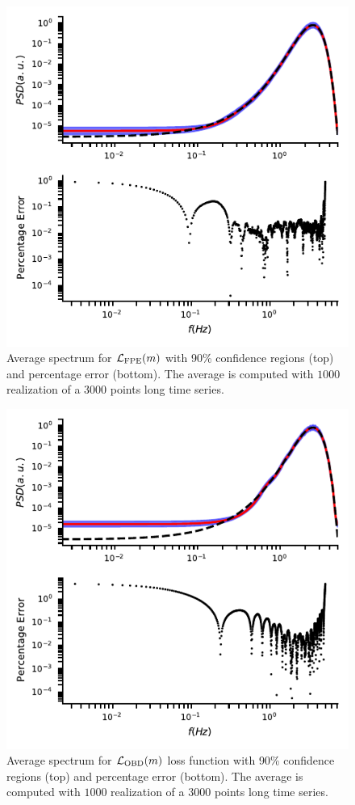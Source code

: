 \documentclass[twocolumn,showpacs,preprintnumbers,nofootinbib,prd,
superscriptaddress,10pt]{revtex4-1}
\begin{document}
\begin{figure}[t]
	\centering
	\includegraphics[width = \linewidth]{Images/optimisers_comparison/normal/FPE_spectrum_estim.pdf}
	\caption{Average spectrum for $\mathcal{L}_{\rm FPE}(m)$ with 90\% confidence regions (top) and percentage error (bottom). The average is computed with $1000$ realization of a $3000$ points long time series.}
	\label{fig:FPEmean}
\end{figure}
\begin{figure}[t]
	\centering
	\includegraphics[width = \linewidth]{Images/optimisers_comparison/normal/OBD_spectrum_estim.pdf}
	\caption{Average spectrum for $\mathcal{L}_{\rm OBD}(m)$ loss function with 90\% confidence regions (top) and percentage error (bottom). The average is computed with $1000$ realization of a $3000$ points long time series.}
	\label{fig:OBDmean}
\end{figure}
\end{document}
